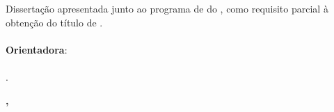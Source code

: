 %
%

\makeatletter
\begin{folhaderosto}
	\thispagestyle{empty}%
	
    \begin{center}
    
		\small\textbf{\expandafter\uppercase\expandafter{\imprimirnomeautor}}\\
		\vspace*{5.2 cm}%
		\normalsize\textbf{\expandafter\uppercase\expandafter{\imprimirtitulotb}}\\
		
    \end{center}
	
	\vspace*{2.35 cm}%
		    \large%
    		\hfill%
	    	\begin{minipage}{8 cm}%
	    		\begin{small} %
	    		\setlength{\baselineskip}{0.8\baselineskip}
				
				
		    	{Dissertação apresentada junto ao programa de {\textbf{\imprimirprograma}}
		    	do {\textbf{\imprimirinstituicao}},
		    	como requisito parcial à obtenção do título de
		    	{\textbf{\imprimirgrau}}.}\\{
		    	}\\\textbf{Orientadora}:\\ \\
		    	{\imprimirtitulacaoorientador }{ }{\imprimirorientador.}\\{
		    	}
				
				
				\end{small} %
		    \end{minipage}%
		    	
		    \vspace*{6.5 cm}%
		    
		    \begin{center} %
		    	\normalsize %
	    		\textbf{\imprimirlocalapresentacao, \imprimirdataapresentacao}
	    	\end{center}%

\end{folhaderosto}
\makeatother
